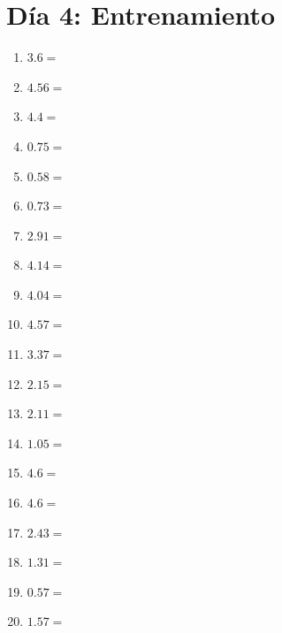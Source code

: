 \documentclass[12pt]{article}
\begin{document}
\section*{Día 4: Entrenamiento}
\begin{enumerate}
\item \large $ 3.6 = $ \vspace{1.5cm}
\item \large $ 4.56 = $ \vspace{1.5cm}
\item \large $ 4.4 = $ \vspace{1.5cm}
\item \large $ 0.75 = $ \vspace{1.5cm}
\item \large $ 0.58 = $ \vspace{1.5cm}
\item \large $ 0.73 = $ \vspace{1.5cm}
\item \large $ 2.91 = $ \vspace{1.5cm}
\item \large $ 4.14 = $ \vspace{1.5cm}
\item \large $ 4.04 = $ \vspace{1.5cm}
\item \large $ 4.57 = $ \vspace{1.5cm}
\newpage
\item \large $ 3.37 = $ \vspace{1.5cm}
\item \large $ 2.15 = $ \vspace{1.5cm}
\item \large $ 2.11 = $ \vspace{1.5cm}
\item \large $ 1.05 = $ \vspace{1.5cm}
\item \large $ 4.6 = $ \vspace{1.5cm}
\item \large $ 4.6 = $ \vspace{1.5cm}
\item \large $ 2.43 = $ \vspace{1.5cm}
\item \large $ 1.31 = $ \vspace{1.5cm}
\item \large $ 0.57 = $ \vspace{1.5cm}
\item \large $ 1.57 = $ \vspace{1.5cm}

\end{enumerate}
\end{document}
